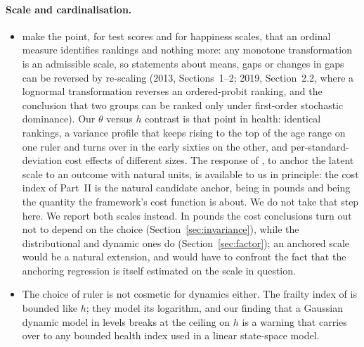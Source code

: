 \documentclass[11pt]{article}
\begin{document}
\paragraph{Scale and cardinalisation.}
\begin{itemize}
\item \citet{bond2013,bond2019} make the point, for test scores and for happiness scales, that an ordinal measure identifies rankings and nothing more: any monotone transformation is an admissible scale, so statements about means, gaps or changes in gaps can be reversed by re-scaling (2013, Sections~1--2; 2019, Section~2.2, where a lognormal transformation reverses an ordered-probit ranking, and the conclusion that two groups can be ranked only under first-order stochastic dominance). Our $\theta$ versus $h$ contrast is that point in health: identical rankings, a variance profile that keeps rising to the top of the age range on one ruler and turns over in the early sixties on the other, and per-standard-deviation cost effects of different sizes. The response of \citet{cunha2008}, to anchor the latent scale to an outcome with natural units, is available to us in principle: the cost index of Part~II is the natural candidate anchor, being in pounds and being the quantity the framework's cost function is about. We do not take that step here. We report both scales instead. In pounds the cost conclusions turn out not to depend on the choice (Section~\ref{sec:invariance}), while the distributional and dynamic ones do (Section~\ref{sec:factor}); an anchored scale would be a natural extension, and would have to confront the fact that the anchoring regression is itself estimated on the scale in question.
\item The choice of ruler is not cosmetic for dynamics either. The frailty index of \citet{hosseini2022} is bounded like $h$; they model its logarithm, and our finding that a Gaussian dynamic model in levels breaks at the ceiling on $h$ is a warning that carries over to any bounded health index used in a linear state-space model.
\end{itemize}
\end{document}

